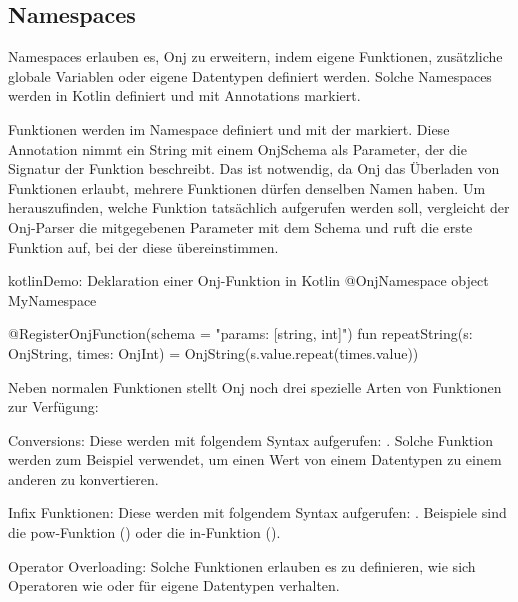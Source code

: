 
\subsection{Namespaces}\label{subsec:namespaces}

\renewcommand{\kapitelautor}{Autor: Marvin Kurka}

Namespaces erlauben es, Onj zu erweitern, indem eigene Funktionen, zusätzliche globale Variablen oder
eigene Datentypen definiert werden.
Solche Namespaces werden in Kotlin definiert und mit Annotations markiert.

Funktionen werden im Namespace definiert und mit der  markiert.
Diese Annotation nimmt ein String mit einem OnjSchema als Parameter, der die Signatur der Funktion beschreibt.
Das ist notwendig, da Onj das Überladen von Funktionen erlaubt, \dah mehrere Funktionen dürfen denselben Namen haben.
Um herauszufinden, welche Funktion tatsächlich aufgerufen werden soll, vergleicht der Onj-Parser die mitgegebenen
Parameter mit dem Schema und ruft die erste Funktion auf, bei der diese übereinstimmen.

\begin{codeBlock}{kotlin}{Demo: Deklaration einer Onj-Funktion in Kotlin}
@OnjNamespace
object MyNamespace {

    @RegisterOnjFunction(schema = "params: [string, int]")
    fun repeatString(s: OnjString, times: OnjInt) = OnjString(s.value.repeat(times.value))
}
\end{codeBlock}

Neben normalen Funktionen stellt Onj noch drei spezielle Arten von Funktionen zur Verfügung:

\begin{liste}
    \item Conversions: Diese werden mit folgendem Syntax aufgerufen: .
        Solche Funktion werden zum Beispiel verwendet, um einen Wert von einem Datentypen zu einem anderen zu
        konvertieren.
    \item Infix Funktionen: Diese werden mit folgendem Syntax aufgerufen: .
        Beispiele sind die pow-Funktion () oder die in-Funktion (\inlineOnj{3 in [1, 2, 3, 4]}).
    \item Operator Overloading: Solche Funktionen erlauben es zu definieren, wie sich Operatoren wie
        \inlineOnj{+} oder \inlineOnj{*} für eigene Datentypen verhalten.
\end{liste}

